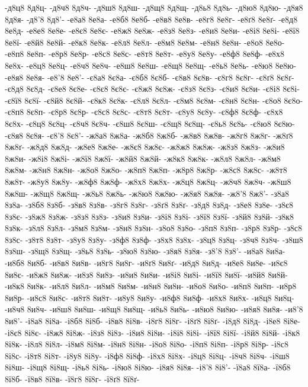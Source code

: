 {-д8ц8
8д8ц-
-д8ч8
8д8ч-
-д8ш8
8д8ш-
-д8щ8
8д8щ-
-д8ь8
8д8ь-
-д8ю8
8д8ю-
-д8я8
8д8я-
-д8'8
8д8'-
-е8а8
8е8а-
-е8б8
8е8б-
-е8в8
8е8в-
-е8г8
8е8г-
-е8ґ8
8е8ґ-
-е8д8
8е8д-
-е8е8
8е8е-
-е8є8
8е8є-
-е8ж8
8е8ж-
-е8з8
8е8з-
-е8и8
8е8и-
-е8і8
8е8і-
-е8ї8
8е8ї-
-е8й8
8е8й-
-е8к8
8е8к-
-е8л8
8е8л-
-е8м8
8е8м-
-е8н8
8е8н-
-е8о8
8е8о-
-е8п8
8е8п-
-е8р8
8е8р-
-е8с8
8е8с-
-е8т8
8е8т-
-е8у8
8е8у-
-е8ф8
8е8ф-
-е8х8
8е8х-
-е8ц8
8е8ц-
-е8ч8
8е8ч-
-е8ш8
8е8ш-
-е8щ8
8е8щ-
-е8ь8
8е8ь-
-е8ю8
8е8ю-
-е8я8
8е8я-
-е8'8
8е8'-
-є8а8
8є8а-
-є8б8
8є8б-
-є8в8
8є8в-
-є8г8
8є8г-
-є8ґ8
8є8ґ-
-є8д8
8є8д-
-є8е8
8є8е-
-є8є8
8є8є-
-є8ж8
8є8ж-
-є8з8
8є8з-
-є8и8
8є8и-
-є8і8
8є8і-
-є8ї8
8є8ї-
-є8й8
8є8й-
-є8к8
8є8к-
-є8л8
8є8л-
-є8м8
8є8м-
-є8н8
8є8н-
-є8о8
8є8о-
-є8п8
8є8п-
-є8р8
8є8р-
-є8с8
8є8с-
-є8т8
8є8т-
-є8у8
8є8у-
-є8ф8
8є8ф-
-є8х8
8є8х-
-є8ц8
8є8ц-
-є8ч8
8є8ч-
-є8ш8
8є8ш-
-є8щ8
8є8щ-
-є8ь8
8є8ь-
-є8ю8
8є8ю-
-є8я8
8є8я-
-є8'8
8є8'-
-ж8а8
8ж8а-
-ж8б8
8ж8б-
-ж8в8
8ж8в-
-ж8г8
8ж8г-
-ж8ґ8
8ж8ґ-
-ж8д8
8ж8д-
-ж8е8
8ж8е-
-ж8є8
8ж8є-
-ж8ж8
8ж8ж-
-ж8з8
8ж8з-
-ж8и8
8ж8и-
-ж8і8
8ж8і-
-ж8ї8
8ж8ї-
-ж8й8
8ж8й-
-ж8к8
8ж8к-
-ж8л8
8ж8л-
-ж8м8
8ж8м-
-ж8н8
8ж8н-
-ж8о8
8ж8о-
-ж8п8
8ж8п-
-ж8р8
8ж8р-
-ж8с8
8ж8с-
-ж8т8
8ж8т-
-ж8у8
8ж8у-
-ж8ф8
8ж8ф-
-ж8х8
8ж8х-
-ж8ц8
8ж8ц-
-ж8ч8
8ж8ч-
-ж8ш8
8ж8ш-
-ж8щ8
8ж8щ-
-ж8ь8
8ж8ь-
-ж8ю8
8ж8ю-
-ж8я8
8ж8я-
-ж8'8
8ж8'-
-з8а8
8з8а-
-з8б8
8з8б-
-з8в8
8з8в-
-з8г8
8з8г-
-з8ґ8
8з8ґ-
-з8д8
8з8д-
-з8е8
8з8е-
-з8є8
8з8є-
-з8ж8
8з8ж-
-з8з8
8з8з-
-з8и8
8з8и-
-з8і8
8з8і-
-з8ї8
8з8ї-
-з8й8
8з8й-
-з8к8
8з8к-
-з8л8
8з8л-
-з8м8
8з8м-
-з8н8
8з8н-
-з8о8
8з8о-
-з8п8
8з8п-
-з8р8
8з8р-
-з8с8
8з8с-
-з8т8
8з8т-
-з8у8
8з8у-
-з8ф8
8з8ф-
-з8х8
8з8х-
-з8ц8
8з8ц-
-з8ч8
8з8ч-
-з8ш8
8з8ш-
-з8щ8
8з8щ-
-з8ь8
8з8ь-
-з8ю8
8з8ю-
-з8я8
8з8я-
-з8'8
8з8'-
-и8а8
8и8а-
-и8б8
8и8б-
-и8в8
8и8в-
-и8г8
8и8г-
-и8ґ8
8и8ґ-
-и8д8
8и8д-
-и8е8
8и8е-
-и8є8
8и8є-
-и8ж8
8и8ж-
-и8з8
8и8з-
-и8и8
8и8и-
-и8і8
8и8і-
-и8ї8
8и8ї-
-и8й8
8и8й-
-и8к8
8и8к-
-и8л8
8и8л-
-и8м8
8и8м-
-и8н8
8и8н-
-и8о8
8и8о-
-и8п8
8и8п-
-и8р8
8и8р-
-и8с8
8и8с-
-и8т8
8и8т-
-и8у8
8и8у-
-и8ф8
8и8ф-
-и8х8
8и8х-
-и8ц8
8и8ц-
-и8ч8
8и8ч-
-и8ш8
8и8ш-
-и8щ8
8и8щ-
-и8ь8
8и8ь-
-и8ю8
8и8ю-
-и8я8
8и8я-
-и8'8
8и8'-
-і8а8
8і8а-
-і8б8
8і8б-
-і8в8
8і8в-
-і8г8
8і8г-
-і8ґ8
8і8ґ-
-і8д8
8і8д-
-і8е8
8і8е-
-і8є8
8і8є-
-і8ж8
8і8ж-
-і8з8
8і8з-
-і8и8
8і8и-
-і8і8
8і8і-
-і8ї8
8і8ї-
-і8й8
8і8й-
-і8к8
8і8к-
-і8л8
8і8л-
-і8м8
8і8м-
-і8н8
8і8н-
-і8о8
8і8о-
-і8п8
8і8п-
-і8р8
8і8р-
-і8с8
8і8с-
-і8т8
8і8т-
-і8у8
8і8у-
-і8ф8
8і8ф-
-і8х8
8і8х-
-і8ц8
8і8ц-
-і8ч8
8і8ч-
-і8ш8
8і8ш-
-і8щ8
8і8щ-
-і8ь8
8і8ь-
-і8ю8
8і8ю-
-і8я8
8і8я-
-і8'8
8і8'-
-ї8а8
8ї8а-
-ї8б8
8ї8б-
-ї8в8
8ї8в-
-ї8г8
8ї8г-
-ї8ґ8
8ї8ґ-
}

